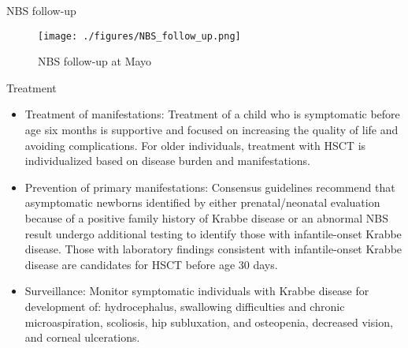 \documentclass[presentation, smaller]{beamer}
\begin{document}
\begin{frame}[label={sec:orgd35cff2}]{NBS follow-up}
\begin{figure}[htbp]
\centering
\texttt{[image: ./figures/NBS\_follow\_up.png]}
\caption{\label{fig:org83881a1}
NBS follow-up at Mayo}
\end{figure}
\end{frame}


\begin{frame}[label={sec:orgb55e264}]{Treatment}
\begin{itemize}
\item Treatment of manifestations: Treatment of a child who is symptomatic
before age six months is supportive and focused on increasing the
quality of life and avoiding complications. For older individuals,
treatment with HSCT is individualized based on disease burden and
manifestations.
\item Prevention of primary manifestations: Consensus guidelines recommend
that asymptomatic newborns identified by either prenatal/neonatal
evaluation because of a positive family history of Krabbe disease or
an abnormal NBS result undergo additional testing to identify those
with infantile-onset Krabbe disease. Those with laboratory findings
consistent with infantile-onset Krabbe disease are candidates for
HSCT before age 30 days.
\item Surveillance: Monitor symptomatic individuals with Krabbe disease
for development of: hydrocephalus, swallowing difficulties and
chronic microaspiration, scoliosis, hip subluxation, and osteopenia,
decreased vision, and corneal ulcerations.
\end{itemize}
\end{frame}
\end{document}
